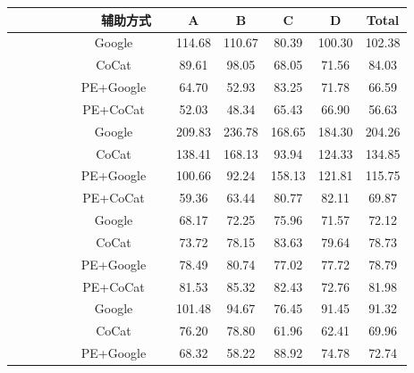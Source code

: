 \begin{table}[!t]
	\begin{threeparttable}
		\begin{tabular}{*{8}{|c}|}
			\hline
			& 　　 & 　　辅助方式　　 & A & B & C & D & Total \\
			\hline
			 &   & Google & 114.68 & 110.67 &  80.39 & 100.30 & 102.38 \\
			&                           &  CoCat &  89.61 &  98.05 &  68.05 &  71.56 &  84.03 \\
			&                           & PE+Google &  64.70 &  52.93 &  83.25 &  71.78 &  66.59 \\
			&                           &  PE+CoCat &  52.03 &  48.34 &  65.43 &  66.90 &  56.63 \\
			&    &    Google & 209.83 & 236.78 & 168.65 & 184.30 & 204.26 \\
			&                           &     CoCat & 138.41 & 168.13 &  93.94 & 124.33 & 134.85 \\
			&                           & PE+Google & 100.66 &  92.24 & 158.13 & 121.81 & 115.75 \\
			&                           &  PE+CoCat &  59.36 &  63.44 &  80.77 &  82.11 &  69.87 \\
			&  &    Google &  68.17 &  72.25 &  75.96 &  71.57 &  72.12 \\
			&                           &     CoCat &  73.72 &  78.15 &  83.63 &  79.64 &  78.73 \\
			&                           & PE+Google &  78.49 &  80.74 &  77.02 &  77.72 &  78.79 \\
			&                           &  PE+CoCat &  81.53 &  85.32 &  82.43 &  72.76 &  81.98 \\
			&   &    Google & 101.48 &  94.67 &  76.45 &  91.45 &  91.32 \\
			&                           &     CoCat &  76.20 &  78.80 &  61.96 &  62.41 &  69.96 \\
			&                           & PE+Google &  68.32 &  58.22 &  88.92 &  74.78 &  72.74 \\

\end{tabular}
\end{threeparttable}
\end{table}
